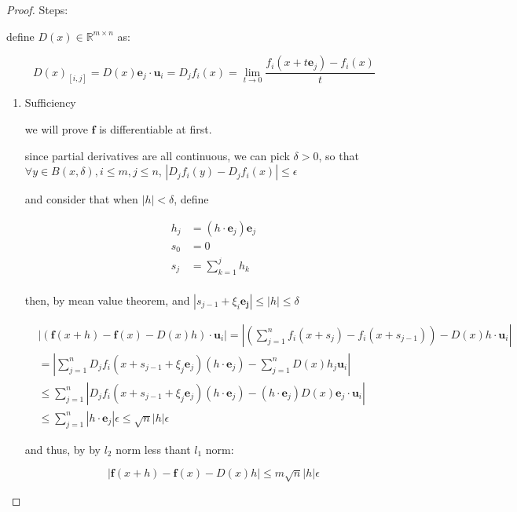 \begin{proof}
    Steps:

    define $D(x) \in \mathbb{R}^{m \times n}$ as:

    \[
D(x)_{[i,j]} = D(x) \mathbf{e}_j \cdot \mathbf{u}_i  = D_jf_i(x) =  \lim_{t \to 0} \frac{f_i(x + t \mathbf{e}_j)- f_i(x)}{t}
    \]

    \begin{enumerate}
        \item Sufficiency

        

        we will prove $\mathbf{f}$ is differentiable at first.

        since partial derivatives are all continuous, we can pick $\delta > 0$, so that $\forall y \in B(x, \delta), i \le m, j \le n$,
        $\left| D_jf_i(y) - D_jf_i(x) \right| \le \epsilon $

        and consider that when $|h| < \delta$, define 

        \begin{align*}
            h_j &= \left(h \cdot \mathbf{e}_j \right) \mathbf{e}_j \\
            s_0 &= 0 \\
            s_j &= \sum_{k=1}^{j} h_k \\
        \end{align*}

        then, by mean value theorem, and $|s_{j-1} + \xi_i \mathbf{e_j}| \le |h| \le \delta$

        \begin{align*}
            &\left|\left(\mathbf{f}(x + h) - \mathbf{f}(x) - D(x)h \right) \cdot \mathbf{u}_i \right| = \left|\left(\sum_{j=1}^{n} f_i(x + s_j)-f_i(x + s_{j-1})\right) - D(x)h \cdot \mathbf{u}_i\right| \\
&= \left|\sum_{j=1}^{n} D_jf_i(x + s_{j-1} + \xi_j \mathbf{e}_j)(h \cdot \mathbf{e}_j) - \sum_{j=1}^{n}D(x)h_j \mathbf{u}_i\right| \\
& \le \sum_{j=1}^{n} \left| D_jf_i(x + s_{j-1} + \xi_j \mathbf{e}_j)(h \cdot \mathbf{e}_j) - (h \cdot \mathbf{e}_j)D(x)\mathbf{e}_j \cdot \mathbf{u}_i\right|  \\ 
& \le \sum_{j=1}^{n} \left| h \cdot \mathbf{e}_j\right| \epsilon \le \sqrt{n} |h | \epsilon
        \end{align*}

        and thus, by by $l_2$ norm less thant $l_1$ norm:

        \[
\left|\mathbf{f}(x + h) - \mathbf{f}(x) - D(x)h  \right| \le m \sqrt{n} |h| \epsilon
        \]


\end{enumerate}
\end{proof}

